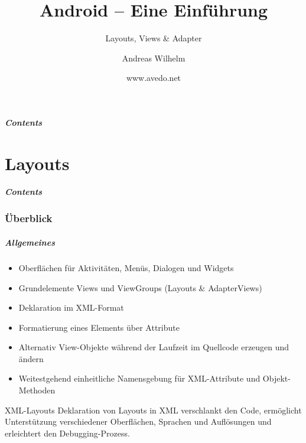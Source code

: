 \title{Android -- Eine Einführung}
\subtitle{Layouts, Views \& Adapter}
\author[A. Wilhelm]{Andreas Wilhelm}
\titlegraphic{}
\date{www.avedo.net}

\begin{frame}[plain]
  \titlepage
\end{frame}

\section[Contents]{}
\begin{frame}
	\frametitle{Contents}
	\tableofcontents[onlyparts]
\end{frame}

\part{Layouts}
\frame{\partpage}
\begin{frame}
	\frametitle{Contents}
	\tableofcontents[]
\end{frame}

\section{Überblick}
\begin{frame}
   \frametitle{Allgemeines}
   \begin{itemize}
      \item Oberflächen für Aktivitäten, Menüs, Dialogen und Widgets
      \item Grundelemente Views und ViewGroups (Layouts \& AdapterViews)
      \item Deklaration im XML-Format
      \item Formatierung eines Elements über Attribute
      \item Alternativ View-Objekte während der Laufzeit im Quellcode 
         erzeugen und ändern
      \item Weitestgehend einheitliche Namensgebung für XML-Attribute 
         und Objekt-Methoden
   \end{itemize}

   \begin{alertblock}{XML-Layouts}
      Deklaration von Layouts in XML verschlankt den Code, 
      ermöglicht Unterstützung verschiedener Oberflächen, Sprachen 
      und Auflösungen und erleichtert den Debugging-Prozess.
   \end{alertblock}
\end{frame}

